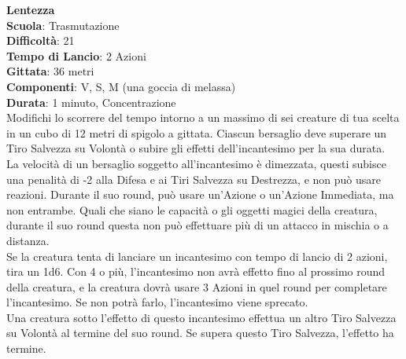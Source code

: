 \begin{multicols}{2}
\medskip\hypertarget{lentezza}{\textbf{Lentezza}}\\
\textbf{Scuola}: Trasmutazione\\
\textbf{Difficoltà}: 21\\
\textbf{Tempo di Lancio}: 2 Azioni\\
\textbf{Gittata}: 36 metri\\
\textbf{Componenti}: V, S, M (una goccia di melassa) \\
\textbf{Durata}: 1 minuto, Concentrazione\\
Modifichi lo scorrere del tempo intorno a un massimo di sei creature di tua scelta in un cubo di 12 metri di spigolo a gittata. Ciascun bersaglio deve superare un Tiro Salvezza su Volontà o subire gli effetti dell'incantesimo per la sua durata.\\
La velocità di un bersaglio soggetto all'incantesimo è dimezzata, questi subisce una penalità di -2 alla Difesa e ai Tiri Salvezza su Destrezza, e non può usare reazioni. Durante il suo round, può usare un'Azione o un'Azione Immediata, ma non entrambe. Quali che siano le capacità o gli oggetti magici della creatura, durante il suo round questa non può effettuare più di un attacco in mischia o a distanza.\\
Se la creatura tenta di lanciare un incantesimo con tempo di lancio di 2 azioni, tira un 1d6. Con 4 o più, l'incantesimo non avrà effetto fino al prossimo round della creatura, e la creatura dovrà usare 3 Azioni in quel round per completare l'incantesimo. Se non potrà farlo, l'incantesimo viene sprecato.\\
Una creatura sotto l'effetto di questo incantesimo effettua un altro Tiro Salvezza su Volontà al termine del suo round. Se supera questo Tiro Salvezza, l'effetto ha termine.\\


\end{multicols}
